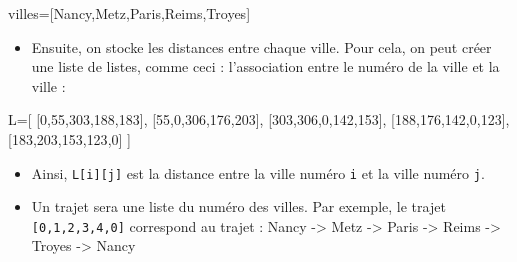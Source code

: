 \documentclass[
  paper=a4,
  ,captions=tableheading
]{scrartcl}
\newenvironment{Shaded}{}{}
\newcommand{\DecValTok}[1]{\textcolor[rgb]{0.25,0.63,0.44}{#1}}
\newcommand{\NormalTok}[1]{#1}
\newcommand{\OperatorTok}[1]{\textcolor[rgb]{0.40,0.40,0.40}{#1}}
\newcommand{\StringTok}[1]{\textcolor[rgb]{0.25,0.44,0.63}{#1}}
\providecommand{\tightlist}{%
  \setlength{\itemsep}{0pt}\setlength{\parskip}{0pt}}
\begin{document}
\begin{Shaded}
\begin{Highlighting}[]
\NormalTok{villes}\OperatorTok{=}\NormalTok{[}\StringTok{\textquotesingle{}Nancy\textquotesingle{}}\NormalTok{,}\StringTok{\textquotesingle{}Metz\textquotesingle{}}\NormalTok{,}\StringTok{\textquotesingle{}Paris\textquotesingle{}}\NormalTok{,}\StringTok{\textquotesingle{}Reims\textquotesingle{}}\NormalTok{,}\StringTok{\textquotesingle{}Troyes\textquotesingle{}}\NormalTok{]}
\end{Highlighting}
\end{Shaded}

\begin{itemize}
\tightlist
\item
  Ensuite, on stocke les distances entre chaque ville. Pour cela, on
  peut créer une liste de listes, comme ceci : l'association entre le
  numéro de la ville et la ville :
\end{itemize}

\begin{Shaded}
\begin{Highlighting}[]
\NormalTok{L}\OperatorTok{=}\NormalTok{[ }
\NormalTok{    [}\DecValTok{0}\NormalTok{,}\DecValTok{55}\NormalTok{,}\DecValTok{303}\NormalTok{,}\DecValTok{188}\NormalTok{,}\DecValTok{183}\NormalTok{],}
\NormalTok{    [}\DecValTok{55}\NormalTok{,}\DecValTok{0}\NormalTok{,}\DecValTok{306}\NormalTok{,}\DecValTok{176}\NormalTok{,}\DecValTok{203}\NormalTok{],}
\NormalTok{    [}\DecValTok{303}\NormalTok{,}\DecValTok{306}\NormalTok{,}\DecValTok{0}\NormalTok{,}\DecValTok{142}\NormalTok{,}\DecValTok{153}\NormalTok{],}
\NormalTok{    [}\DecValTok{188}\NormalTok{,}\DecValTok{176}\NormalTok{,}\DecValTok{142}\NormalTok{,}\DecValTok{0}\NormalTok{,}\DecValTok{123}\NormalTok{],}
\NormalTok{    [}\DecValTok{183}\NormalTok{,}\DecValTok{203}\NormalTok{,}\DecValTok{153}\NormalTok{,}\DecValTok{123}\NormalTok{,}\DecValTok{0}\NormalTok{]}
\NormalTok{]}
\end{Highlighting}
\end{Shaded}

\begin{itemize}
\tightlist
\item
  Ainsi, \texttt{L{[}i{]}{[}j{]}} est la distance entre la ville numéro
  \texttt{i} et la ville numéro \texttt{j}.
\item
  Un trajet sera une liste du numéro des villes. Par exemple, le trajet
  \texttt{{[}0,1,2,3,4,0{]}} correspond au trajet : Nancy
  -\textgreater{} Metz -\textgreater{} Paris -\textgreater{} Reims
  -\textgreater{} Troyes -\textgreater{} Nancy
\end{itemize}
\end{document}
